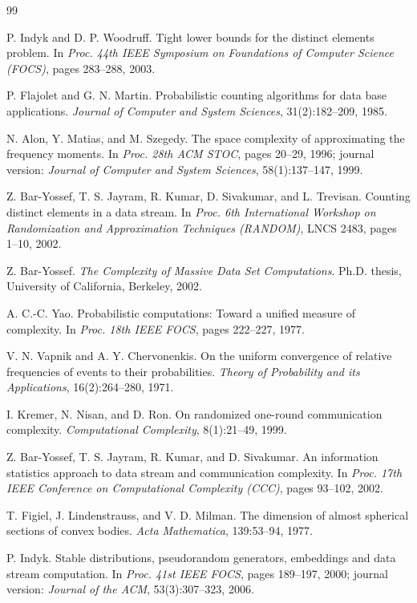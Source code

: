 \documentclass[UTF8, 11pt, a4paper, linestretch=1.15]{ctexart}
\theoremstyle{zhstyle}
\begin{document}
	\begin{thebibliography}{99}
		
		 P. Indyk and D. P. Woodruff.
		Tight lower bounds for the distinct elements problem.
		In \emph{Proc. 44th IEEE Symposium on Foundations of Computer Science (FOCS)},
		pages 283--288, 2003.
		
		 P. Flajolet and G. N. Martin.
		Probabilistic counting algorithms for data base applications.
		\emph{Journal of Computer and System Sciences}, 31(2):182--209, 1985.
		
		 N. Alon, Y. Matias, and M. Szegedy.
		The space complexity of approximating the frequency moments.
		In \emph{Proc. 28th ACM STOC}, pages 20--29, 1996;
		journal version: \emph{Journal of Computer and System Sciences}, 58(1):137--147, 1999.
		
		 Z. Bar-Yossef, T. S. Jayram, R. Kumar, D. Sivakumar, and L. Trevisan.
		Counting distinct elements in a data stream.
		In \emph{Proc. 6th International Workshop on Randomization and Approximation
			Techniques (RANDOM)}, LNCS 2483, pages 1--10, 2002.
		
		 Z. Bar-Yossef.
		\emph{The Complexity of Massive Data Set Computations}.
		Ph.D. thesis, University of California, Berkeley, 2002.
		
		 A. C.-C. Yao.
		Probabilistic computations: Toward a unified measure of complexity.
		In \emph{Proc. 18th IEEE FOCS}, pages 222--227, 1977.
		
		 V. N. Vapnik and A. Y. Chervonenkis.
		On the uniform convergence of relative frequencies of events to their probabilities.
		\emph{Theory of Probability and its Applications}, 16(2):264--280, 1971.
		
		 I. Kremer, N. Nisan, and D. Ron.
		On randomized one-round communication complexity.
		\emph{Computational Complexity}, 8(1):21--49, 1999.
		
		 Z. Bar-Yossef, T. S. Jayram, R. Kumar, and D. Sivakumar.
		An information statistics approach to data stream and communication complexity.
		In \emph{Proc. 17th IEEE Conference on Computational Complexity (CCC)},
		pages 93--102, 2002.
		
		 T. Figiel, J. Lindenstrauss, and V. D. Milman.
		The dimension of almost spherical sections of convex bodies.
		\emph{Acta Mathematica}, 139:53--94, 1977.
		
		 P. Indyk.
		Stable distributions, pseudorandom generators, embeddings and data stream computation.
		In \emph{Proc. 41st IEEE FOCS}, pages 189--197, 2000;
		journal version: \emph{Journal of the ACM}, 53(3):307--323, 2006.
		

\end{thebibliography}
\end{document}
